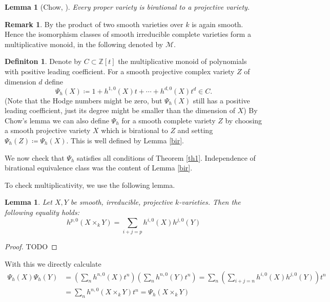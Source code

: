 \documentclass[11pt, a4paper, german]{article}
\theoremstyle{plain}
\newtheorem{lemma}[theorem]{Lemma}
\theoremstyle{definition}
\newtheorem{definition}[theorem]{Definiton}
\newtheorem{remark}[theorem]{Remark}
\begin{document}
\begin{lemma}[Chow, {\cite[II Ex. 4.10]{Ha}}]
    Every proper variety is birational to a projective variety.
\end{lemma}

\begin{remark}
    By \cite[Prop. 10.1 (d)]{Ha} the product of two smooth varieties over $k$ is again smooth. Hence the isomorphism classes of smooth
    irreducible complete varieties form a multiplicative monoid, in the following denoted by $\mathcal{M}$.
\end{remark}
\begin{definition}
    Denote by $C \subset \mathbb{Z}[t]$ the multiplicative monoid of polynomials with positive leading coefficient.
    For a smooth projective complex variety $Z$ of dimension $d$ define
    \[
        \Psi_h(X) \coloneqq1 + h^{1,0}(X)t + \cdots + h^{d,0}(X)t^d \in C.
    \]
    (Note that the Hodge numbers might be zero, but $\Psi_h(X)$ still has a positive leading coefficient, 
    just its degree might be smaller than the dimension of $X$)
    By Chow's lemma we can also define $\Psi_h$ for a smooth complete variety $Z$ by choosing a smooth projective variety $X$ which is birational
    to $Z$ and setting $\Psi_h(Z) \coloneqq \Psi_h(X)$. This is well defined by Lemma \ref{bir}.
\end{definition}

We now check that $\Psi_h$ satisfies all conditions of Theorem \ref{th1}. Independence of birational equivalence class was the content of Lemma
\ref{bir}. 

To check multiplicativity, we use the following lemma.

\begin{lemma}
    Let $X,Y$ be smooth, irreducible, projective $k$-varieties. Then the following equality holds:
    \[
        h^{p,0}(X \times_k Y) = \sum_{i+j=p} h^{i,0}(X)h^{j,0}(Y)
    \]
\end{lemma}
\begin{proof} TODO \end{proof}

With this we directly calculate 
\begin{align*}
    \Psi_h(X)\Psi_h(Y) &= \left( \sum_n h^{n,0}(X)t^n \right) \left( \sum_n h^{n,0}(Y)t^n \right)  
    = \sum_n \left( \sum_{i+j=n} h^{i,0}(X) h^{j,0}(Y) \right )t^n \\ &= \sum_n h^{n,0}(X \times_k Y)t^n = \Psi_h(X \times_k Y)
\end{align*}
\end{document}
